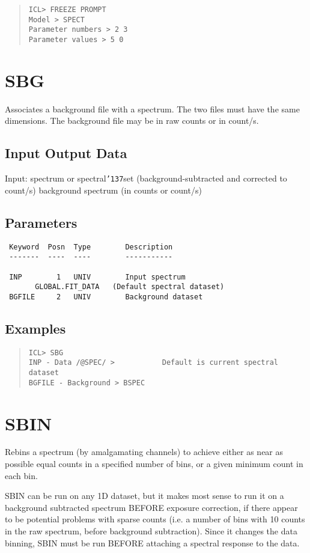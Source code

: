\documentclass{book}
\renewcommand{\_}{{\tt\char'137}}     %
\begin{document}
\begin{quote}\begin{verbatim}
ICL> FREEZE PROMPT
Model > SPECT
Parameter numbers > 2 3
Parameter values > 5 0
\end{verbatim}\end{quote}
\section{SBG}
Associates a background file with a spectrum.
The two files must have the same dimensions. The background file
may be in raw counts or in count/s.

\subsection{Input Output Data}
Input: spectrum or spectral\_set (background-subtracted and corrected
to count/s)
background spectrum (in counts or count/s)
\subsection{Parameters}
\begin{verbatim}
 Keyword  Posn  Type        Description
 -------  ----  ----        -----------

 INP        1   UNIV        Input spectrum
       GLOBAL.FIT_DATA   (Default spectral dataset)
 BGFILE     2   UNIV        Background dataset

\end{verbatim}\subsection{Examples}
\begin{quote}\begin{verbatim}
ICL> SBG
INP - Data /@SPEC/ >           Default is current spectral dataset
BGFILE - Background > BSPEC
\end{verbatim}\end{quote}
\section{SBIN}
Rebins a spectrum (by amalgamating channels) to achieve either as
near as possible equal counts in a specified number of bins, or a
given minimum count in each bin.

SBIN can be run on any 1D dataset, but it makes most sense to
run it on a background subtracted spectrum BEFORE exposure
correction, if there appear to be potential problems with
sparse counts (i.e. a number of bins with 10 counts in the
raw spectrum, before background subtraction). Since it changes
the data binning, SBIN must be run BEFORE attaching a spectral
response to the data.
\end{document}
